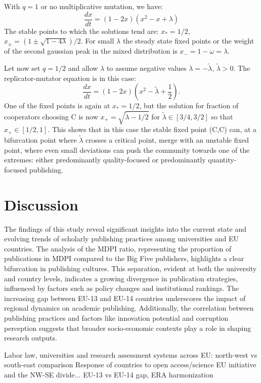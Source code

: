 \documentclass[amsfonts, amssymb, prl, superscriptaddress, notitlepage, twocolumn, nofootinbib]{revtex4-2}
\begin{document}
With $q=1$ or no multiplicative mutation, we have:
\begin{equation}
    \frac{dx}{dt} = (1-2x)(x^2-x+\lambda)
\end{equation}
The stable points to which the solutions tend are: $x_*=1/2$, $x_{\pm}=(1\pm\sqrt{1-4\lambda})/2$. For small $\lambda$ the steady state fixed points or the weight of the second gaussian peak in the mixed distribution is $x_- =1-\omega=\lambda$.

Let now set $q=1/2$ and allow $\lambda$ to assume negative values $\lambda = -\tilde{\lambda},\, \tilde{\lambda}>0$. The replicator-mutator equation is in this case:
\begin{equation}
    \frac{dx}{dt} = (1-2x)\left(x^2-\tilde{\lambda} +\frac{1}{2}\right).
\end{equation}
One of the fixed points is again at $x_*=1/2$, but the solution for fraction of cooperators choosing C is now $x_+ = \sqrt{\tilde{\lambda}-1/2}$ for $\tilde\lambda\in [3/4,3/2]$ so that $x_+ \in [1/2,1]$. This shows that in this case the stable fixed point (C,C) can, at a bifurcation point where $\tilde\lambda$ crosses a critical point, merge with an unstable fixed point, where even small deviations can push the community towards one of the extremes: either predominantly quality-focused or predominantly quantity-focused publishing. 


\section{Discussion}
The findings of this study reveal significant insights into the current state and evolving trends of scholarly publishing practices among universities and EU countries. The analysis of the MDPI ratio, representing the proportion of publications in MDPI compared to the Big Five publishers, highlights a clear bifurcation in publishing cultures. This separation, evident at both the university and country levels, indicates a growing divergence in publication strategies, influenced by factors such as policy changes and institutional rankings. The increasing gap between EU-13 and EU-14 countries underscores the impact of regional dynamics on academic publishing. Additionally, the correlation between publishing practices and factors like innovation potential and corruption perception suggests that broader socio-economic contexts play a role in shaping research outputs. 

Labor law, universities and research assessment systems across EU: north-west vs south-east comparison 
Response of countries to open access/science EU initiative and the NW-SE divide... EU-13 vs EU-14 gap, ERA harmonization
\end{document}
